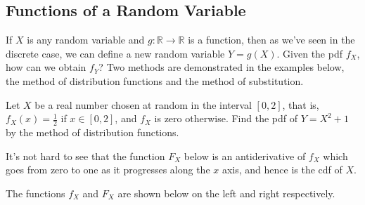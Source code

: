 \subsection*{Functions of a Random Variable}

If $X$ is any random variable and $g: \mathbb{R} \to \mathbb{R}$ is a function, then as we've seen in the discrete case, we can define a new random variable $Y = g(X)$. Given the pdf $f_X$, how can we obtain $f_Y$? Two methods are demonstrated in the examples below, the method of distribution functions and the method of substitution.

\begin{examp}\label{MethodDistributionEx}Let $X$ be a real number chosen at random in the interval $[0,2]$, that is, $f_X(x) = \frac{1}{2}$ if $x \in [0,2]$, and $f_X$ is zero otherwise. Find the pdf of $Y = X^2 + 1$ by the method of distribution functions.
\par
\noindent It's not hard to see that the function $F_X$ below is an antiderivative of $f_X$ which goes from zero to one as it progresses along the $x$ axis, and hence is the cdf of $X$.
\renewcommand*{\arraystretch}{1.35}
\renewcommand*{\arraystretch}{1}
\par
\noindent The functions $f_X$ and $F_X$ are shown below on the left and right respectively.


\end{examp}
